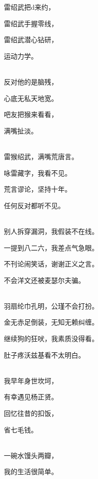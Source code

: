 \documentclass[UTF8,12pt,oneside]{ctexbook}
\begin{document}
        \begin{center}
            雷绍武把d来约，
            
            雷绍武手握零线，
            
            雷绍武潜心钻研，
            
            运动力学。
            
            ~\\
            反对他的是脑残，
            
            心底无私天地宽。
            
            吧友把猴来看看，
            
            满嘴扯淡。
            
            ~\\
            雷猴绍武，满嘴荒唐言。
            
            咏雷藏字，我看不见。
            
            荒言谬论，坚持十年。
            
            任何反对都听不见。
            
            ~\\
            别人拆穿漏洞，我假装不在线。
            
            一提到八二六，我差点气急眼。
            
            不刊论闹笑话，谢谢正义之言。
            
            不会洋文还被麦瑟尔夫骗。
            
            ~\\
            羽扇纶巾孔明，公瑾不会打扮。
            
            金无赤足倒装，无知无赖纠缠。
            
            继续狗的狂吠，我素质没得看。
            
            肚子疼沃兹基看不太明白。
            
            ~\\
            我早年身世坎坷，
            
            有幸遇见杨正贤。
            
            回忆往昔的扣饭，
            
            省七毛钱。
            
            ~\\
            一碗水馒头两瓣，
            
            我的生活很简单。
            

\end{center}
\end{document}
